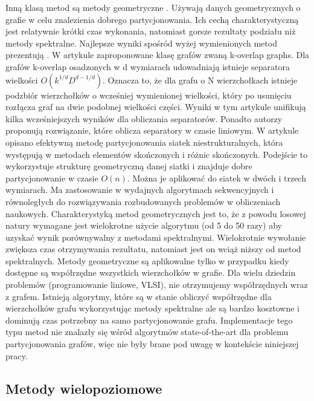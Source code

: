 Inną klasą metod są metody geometryczne
\cite{Miller1994ACP, Raghavan93lineand, 185417, MiTeThVa93, NourOmid1987SolvingFE}.
Używają danych geometrycznych o grafie w celu znalezienia dobrego partycjonowania.
Ich cechą charakterystyczną jest relatywnie krótki czas wykonania, natomiast gorsze rezultaty podziału niż metody spektralne.
Najlepsze wyniki spośród wyżej wymienionych metod prezentują \cite{185417, MiTeThVa93}.
W artykule \cite{185417} zaproponowane klasę grafów zwaną k-overlap graphs. Dla grafów k-overlap osadzonych w d wymiarach
 \cite{wiki:Graph_embedding} udowadniają istnieje separatora wielkości \(O(k^{1/d}D^{{d-1}/d})\).
Oznacza to, że dla grafu o N wierzchołkach istnieje podzbiór
wierzchołków o wcześniej wymienionej wielkości, który po usunięciu rozłącza graf na dwie podobnej wielkości części.
Wyniki w tym artykule unifikują kilka wcześniejszych wyników dla obliczania separatorów.
Ponadto autorzy proponują rozwiązanie, które oblicza separatory w czasie liniowym.
W artykule \cite{MiTeThVa93} opisano efektywną metodę partycjonowania siatek niestrukturalnych, która występują w metodach
elementów skończonych i różnic skończonych. Podejście to wykorzystuje strukturę geometryczną danej siatki i znajduje
dobre partycjonowanie w czasie \(O(n)\). Można je aplikować do siatek w dwóch i trzech wymiarach. Ma zastosowanie
w wydajnych algorytmach sekwencyjnych i równoległych do rozwiązywania rozbudowanych problemów w obliczeniach naukowych.
Charakterystyką metod geometrycznych jest to, że z powodu losowej natury wymagane jest wielokrotne użycie algorytmu
(od 5 do 50 razy) aby uzyskać wynik porównywalny z metodami spektralnymi.
Wielokrotnie wywołanie zwiększa czas otrzymywania rezultatu, natomiast jest
on wciąż niższy od metod spektralnych. Metody geometryczne są aplikowalne tylko w przypadku kiedy dostępne
są współrzędne wszystkich wierzchołków w grafie. Dla wielu dziedzin problemów (programowanie liniowe, VLSI),
nie otrzymujemy współrzędnych wraz z grafem. Istnieją algorytmy, które są w stanie obliczyć współrzędne dla
wierzchołków grafu \cite{Chan95geometricspectral} wykorzystując metody spektralne ale są bardzo kosztowne i dominują czas potrzebny
na samo partycjonowanie grafu.
Implementacje tego typu metod nie znalazły się wśród algorytmów state-of-the-art dla problemu partycjonowania grafów,
więc nie były brane pod uwagę w kontekście niniejszej pracy.

\newpage

\subsection{Metody wielopoziomowe}


